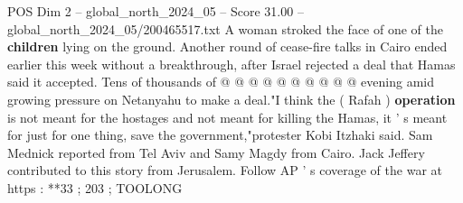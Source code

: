 \begin{textsample}{POS Dim 2 – global\_north\_2024\_05 – Score 31.00 – global\_north\_2024\_05/200465517.txt}
A woman stroked the face of one of the \textbf{children} lying on the ground.
Another round of cease-fire talks in Cairo ended earlier this week without a breakthrough, after Israel rejected a deal that Hamas said it accepted.
Tens of thousands of @ @ @ @ @ @ @ @ @ @ evening amid growing pressure on Netanyahu to make a deal."I think the ( Rafah ) \textbf{operation} is not meant for the hostages and not meant for killing the Hamas, it ' s meant for just for one thing, save the government,"protester Kobi Itzhaki said.
Sam Mednick reported from Tel Aviv and Samy Magdy from Cairo.
Jack Jeffery contributed to this story from Jerusalem.
Follow AP ' s coverage of the war at https : **33 ; 203 ; TOOLONG

\end{textsample}

